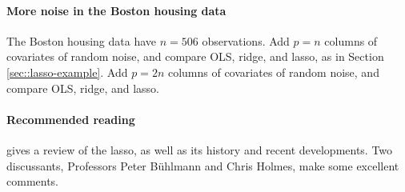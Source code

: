  

\paragraph{More noise in the Boston housing data}

The Boston housing data have $n=506$ observations. Add $p=n$ columns of covariates of random noise, and compare OLS, ridge, and lasso, as in Section \ref{sec::lasso-example}. Add $p=2n$ columns of covariates of random noise, and compare OLS, ridge, and lasso. 

 
\paragraph{Recommended reading}


\citet{tibshirani2011regression}  gives a review of the lasso, as well as its history and recent developments. Two discussants, Professors Peter B\"uhlmann and Chris Holmes, make some excellent comments. 

 
 

